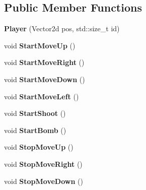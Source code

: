\subsection*{Public Member Functions}
\begin{DoxyCompactItemize}
\item 
{\bfseries Player} (Vector2d pos, std\+::size\+\_\+t id)\hypertarget{class_player_abaf5d01c3bdb9bc4910e207c5fbaca71}{}\label{class_player_abaf5d01c3bdb9bc4910e207c5fbaca71}

\item 
void {\bfseries Start\+Move\+Up} ()\hypertarget{class_player_a9d11db44974bd6d7d25a86eb3c88ed39}{}\label{class_player_a9d11db44974bd6d7d25a86eb3c88ed39}

\item 
void {\bfseries Start\+Move\+Right} ()\hypertarget{class_player_aac2acccb7e9ea01ae90a5215a951de28}{}\label{class_player_aac2acccb7e9ea01ae90a5215a951de28}

\item 
void {\bfseries Start\+Move\+Down} ()\hypertarget{class_player_aac72ce0bdfd6e0f96085c770152c74d1}{}\label{class_player_aac72ce0bdfd6e0f96085c770152c74d1}

\item 
void {\bfseries Start\+Move\+Left} ()\hypertarget{class_player_a88d7b73647417794e0b04962dfc0737c}{}\label{class_player_a88d7b73647417794e0b04962dfc0737c}

\item 
void {\bfseries Start\+Shoot} ()\hypertarget{class_player_afb41219ecc4bef5cb21d292277568444}{}\label{class_player_afb41219ecc4bef5cb21d292277568444}

\item 
void {\bfseries Start\+Bomb} ()\hypertarget{class_player_a8d63e5250dba5f45b39f6f8b8500f789}{}\label{class_player_a8d63e5250dba5f45b39f6f8b8500f789}

\item 
void {\bfseries Stop\+Move\+Up} ()\hypertarget{class_player_a34b112f191815bbcbbe2b76f8ddeeaa0}{}\label{class_player_a34b112f191815bbcbbe2b76f8ddeeaa0}

\item 
void {\bfseries Stop\+Move\+Right} ()\hypertarget{class_player_afe8a6642b8d56dee3374836f85c6a71a}{}\label{class_player_afe8a6642b8d56dee3374836f85c6a71a}

\item 
void {\bfseries Stop\+Move\+Down} ()\hypertarget{class_player_a646dbd3a5d606813fdd822f8de2d0e4f}{}\label{class_player_a646dbd3a5d606813fdd822f8de2d0e4f}


\end{DoxyCompactItemize}
